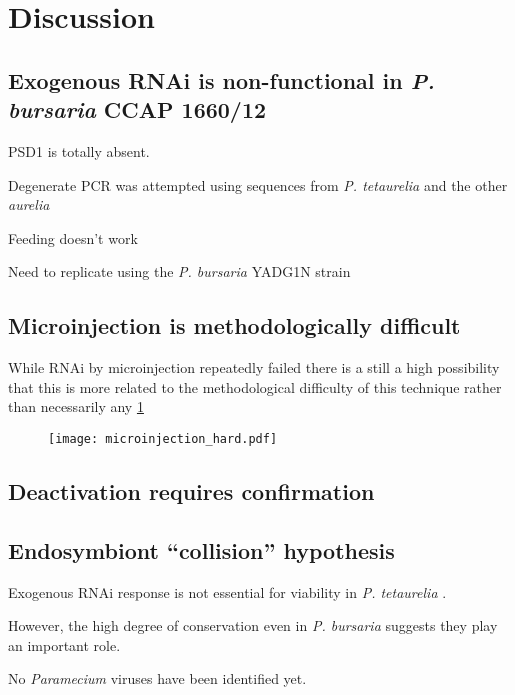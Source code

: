 \section{Discussion}

\subsection{Exogenous RNAi is non-functional in \textit{P. bursaria} CCAP 1660/12}

PSD1 is totally absent. 

Degenerate PCR was attempted using sequences from \textit{P. tetaurelia} and 
the other \textit{aurelia}


Feeding doesn't work 

Need to replicate using the \textit{P. bursaria} YADG1N strain

\subsection{Microinjection is methodologically difficult}

While RNAi by microinjection repeatedly failed there is a still a high possibility
that this is more related to the methodological difficulty of this technique rather than
necessarily any 
\cref{fig:microinjection_nucleus}

\begin{figure}
    \texttt{[image: microinjection\_hard.pdf]}
    \caption{}
    \label{fig:microinjection_nucleus}
\end{figure}


\subsection{Deactivation requires confirmation}





\subsection{Endosymbiont ``collision'' hypothesis}

Exogenous RNAi response is not essential for viability in \textit{P. tetaurelia}
\citep{Marker2014}.

However, the high degree of conservation even in \textit{P. bursaria}
suggests they play an important role. 

No \textit{Paramecium} viruses have been identified yet. 

